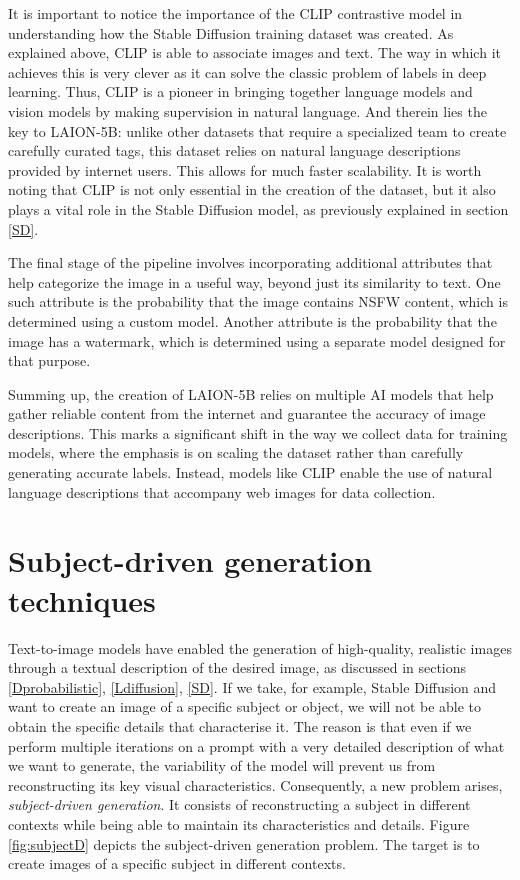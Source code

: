 It is important to notice the importance of the CLIP contrastive model in understanding how the Stable Diffusion training dataset was created. As explained above, CLIP is able to associate images and text. The way in which it achieves this is very clever as it can solve the classic problem of labels in deep learning. Thus, CLIP is a pioneer in bringing together language models and vision models by making supervision in natural language. And therein lies the key to LAION-5B: unlike other datasets that require a specialized team to create carefully curated tags, this dataset relies on natural language descriptions provided by internet users. This allows for much faster scalability. It is worth noting that CLIP is not only essential in the creation of the dataset, but it also plays a vital role in the Stable Diffusion model, as previously explained in section \ref{SD}.

The final stage of the pipeline involves incorporating additional attributes that help categorize the image in a useful way, beyond just its similarity to text. One such attribute is the probability that the image contains NSFW content, which is determined using a custom model. Another attribute is the probability that the image has a watermark, which is determined using a separate model designed for that purpose.

Summing up, the creation of LAION-5B relies on multiple AI models that help gather reliable content from the internet and guarantee the accuracy of image descriptions. This marks a significant shift in the way we collect data for training models, where the emphasis is on scaling the dataset rather than carefully generating accurate labels. Instead, models like CLIP enable the use of natural language descriptions that accompany web images for data collection.

\section{Subject-driven generation techniques}

Text-to-image models have enabled the generation of high-quality, realistic images through a textual description of the desired image, as discussed in sections \ref{Dprobabilistic}, \ref{Ldiffusion}, \ref{SD}. If we take, for example, Stable Diffusion and want to create an image of a specific subject or object, we will not be able to obtain the specific details that characterise it. The reason is that even if we perform multiple iterations on a prompt with a very detailed description of what we want to generate, the variability of the model will prevent us from reconstructing its key visual characteristics. Consequently, a new problem arises, \textit{subject-driven generation}. It consists of reconstructing a subject in different contexts while being able to maintain its characteristics and details. Figure \ref{fig:subjectD} depicts the subject-driven generation problem. The target is to create images of a specific subject in different contexts.

